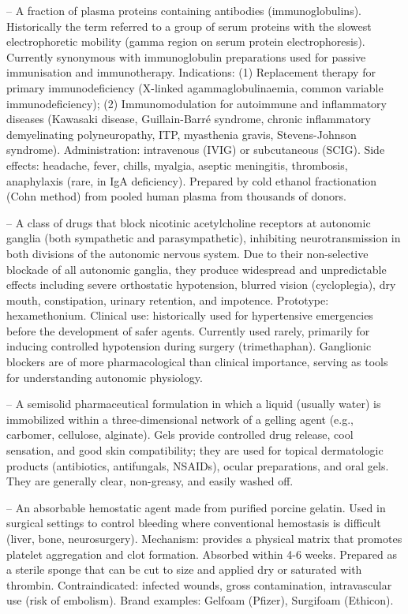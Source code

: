 -- A fraction of plasma proteins containing antibodies (immunoglobulins). Historically the term referred to a group of serum proteins with the slowest electrophoretic mobility (gamma region on serum protein electrophoresis). Currently synonymous with immunoglobulin preparations used for passive immunisation and immunotherapy. Indications: (1) Replacement therapy for primary immunodeficiency (X-linked agammaglobulinaemia, common variable immunodeficiency); (2) Immunomodulation for autoimmune and inflammatory diseases (Kawasaki disease, Guillain-Barré syndrome, chronic inflammatory demyelinating polyneuropathy, ITP, myasthenia gravis, Stevens-Johnson syndrome). Administration: intravenous (IVIG) or subcutaneous (SCIG). Side effects: headache, fever, chills, myalgia, aseptic meningitis, thrombosis, anaphylaxis (rare, in IgA deficiency). Prepared by cold ethanol fractionation (Cohn method) from pooled human plasma from thousands of donors.

-- A class of drugs that block nicotinic acetylcholine receptors at autonomic ganglia (both sympathetic and parasympathetic), inhibiting neurotransmission in both divisions of the autonomic nervous system. Due to their non-selective blockade of all autonomic ganglia, they produce widespread and unpredictable effects including severe orthostatic hypotension, blurred vision (cycloplegia), dry mouth, constipation, urinary retention, and impotence. Prototype: hexamethonium. Clinical use: historically used for hypertensive emergencies before the development of safer agents. Currently used rarely, primarily for inducing controlled hypotension during surgery (trimethaphan). Ganglionic blockers are of more pharmacological than clinical importance, serving as tools for understanding autonomic physiology.

-- A semisolid pharmaceutical formulation in which a liquid (usually water) is immobilized within a three-dimensional network of a gelling agent (e.g., carbomer, cellulose, alginate). Gels provide controlled drug release, cool sensation, and good skin compatibility; they are used for topical dermatologic products (antibiotics, antifungals, NSAIDs), ocular preparations, and oral gels. They are generally clear, non-greasy, and easily washed off.

-- An absorbable hemostatic agent made from purified porcine gelatin. Used in surgical settings to control bleeding where conventional hemostasis is difficult (liver, bone, neurosurgery). Mechanism: provides a physical matrix that promotes platelet aggregation and clot formation. Absorbed within 4-6 weeks. Prepared as a sterile sponge that can be cut to size and applied dry or saturated with thrombin. Contraindicated: infected wounds, gross contamination, intravascular use (risk of embolism). Brand examples: Gelfoam (Pfizer), Surgifoam (Ethicon).

